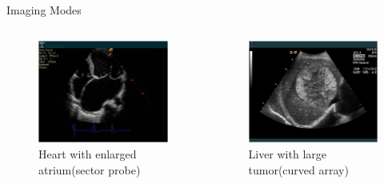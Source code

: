 \begin{frame}{Imaging Modes \cont}

    \begin{columns}[b]
        \begin{figure}
            \centering
            \includegraphics[width=.95\columnwidth]{images/b-mode_sector_probe.png}
            \caption{\normalsize Heart with enlarged atrium\newline (sector probe)}
        \end{figure}

        \begin{figure}
            \centering
            \includegraphics[width=.95\columnwidth]{images/b-mode_curved_array.png}
            \caption{\normalsize Liver with large tumor\newline (curved array)}
        \end{figure}
    \end{columns}

\end{frame}


